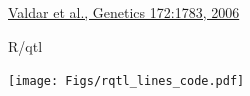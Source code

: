 \documentclass[12pt]{article}
\newcommand{\headsize}{\fontsize{35}{35} \selectfont}
\newcommand{\smallestsize}{\fontsize{18}{22} \selectfont}
\begin{document}
\vfill

\hfill {\smallestsize \color{myblue} \href{http://www.genetics.org/content/172/3/1783.full}{Valdar et al., Genetics 172:1783, 2006}}

\vspace*{5mm}


\newpage

\headsize \color{myyellow}
\hfill \begin{minipage}{5.75in}
\centering
R/qtl
\end{minipage}

\vfill

\centerline{\texttt{[image: Figs/rqtl\_lines\_code.pdf]}}

\vspace{15mm}
\end{document}
